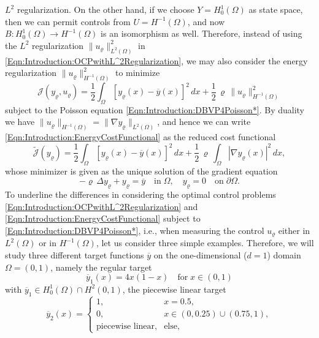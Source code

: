 \documentclass{article}
\numberwithin{equation}{section}
\begin{document}
$L^2$ regularization. On the other hand, if we choose $Y=H_0^1(\Omega)$
as state space, then we can permit controls from $U = H^{-1}(\Omega)$,
and now $B: H_0^1(\Omega) \rightarrow H^{-1}(\Omega)$ is an isomorphism as well.
Therefore, instead of using the $L^2$ regularization
$\| u_\varrho \|_{L^2(\Omega)}^2$ in
\eqref{Eqn:Introduction:OCPwithL^2Regularization},
we may also consider the energy
regularization $\| u_\varrho \|^2_{H^{-1}(\Omega)}$ to minimize
\begin{equation}\label{Eqn:Introduction:EnergyCostFunctional}
  {\mathcal{J}}(y_\varrho, u_\varrho) =
  \frac{1}{2} \int_\Omega [y_\varrho(x)-\overline{y}(x)]^2 \, dx +
  \frac{1}{2} \, \varrho \, \| u_\varrho \|^2_{H^{-1}(\Omega)}
\end{equation}
subject to the Poisson equation \eqref{Eqn:Introduction:DBVP4Poisson*}.
By duality we have
$ \| u_\varrho \|_{H^{-1}(\Omega)} = \| \nabla y_\varrho \|_{L^2(\Omega)}$, and
hence we can write \eqref{Eqn:Introduction:EnergyCostFunctional} as the
reduced cost functional
\begin{equation}\label{Eqn:Introduction:ReducedEnergyCostFunctional}
  \widetilde{\mathcal{J}}(y_\varrho) =
  \frac{1}{2} \int_\Omega [y_\varrho(x)-\overline{y}(x)]^2 \, dx +
  \frac{1}{2} \, \varrho \, \int_\Omega |\nabla y_\varrho(x)|^2 \, dx,
\end{equation}
whose minimizer is given as the unique solution of the gradient equation
\begin{equation}\label{Eqn:Introduction:EnergyGradient}
  - \varrho \, \Delta y_\varrho + y_\varrho = \overline{y}
  \quad \mbox{in} \; \Omega, \quad y_\varrho = 0 \quad
  \mbox{on} \; \partial \Omega .
\end{equation}
To underline the differences in considering the optimal control problems 
\eqref{Eqn:Introduction:OCPwithL^2Regularization} and
\eqref{Eqn:Introduction:EnergyCostFunctional} subject to
\eqref{Eqn:Introduction:DBVP4Poisson*}, i.e.,
when measuring the control $u_\varrho$ either in $L^2(\Omega)$ or in
$H^{-1}(\Omega)$, let us consider three simple examples. Therefore, we will
study three different target functions $\overline{y}$ on the
one-dimensional ($d=1$) domain $\Omega = (0,1)$, 
namely the regular target
\begin{equation}\label{Eqn:Introduction:target-u1}
  \overline{y}_1(x) = 4x(1-x) \quad \mbox{for} \; x \in (0,1)
\end{equation}
with $\overline{y}_1 \in H^1_0(\Omega) \cap H^2(0,1)$, 
the piecewise linear target
\begin{equation}\label{Eqn:Introduction:target-u2}
  \overline{y}_2(x) =\begin{cases}
    1,& x=0.5,\\
    0,& x\in (0,0.25)\cup (0.75,1),\\
    \text{piecewise linear}, & \text{else}, 
  \end{cases}
\end{equation}
\end{document}
